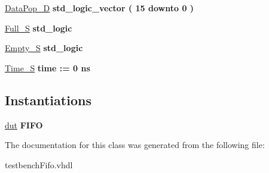\begin{DoxyCompactItemize}
\hyperlink{classtestbenchFifo_1_1behavioural_ae499ada87cc818d9c7db0eb51171e2a3}{Data\+Pop\+\_\+D} {\bfseries \textcolor{vhdlchar}{std\+\_\+logic\+\_\+vector}\textcolor{vhdlchar}{ }\textcolor{vhdlchar}{(}\textcolor{vhdlchar}{ }\textcolor{vhdlchar}{ } \textcolor{vhdldigit}{15} \textcolor{vhdlchar}{ }\textcolor{vhdlchar}{downto}\textcolor{vhdlchar}{ }\textcolor{vhdlchar}{ } \textcolor{vhdldigit}{0} \textcolor{vhdlchar}{ }\textcolor{vhdlchar}{)}\textcolor{vhdlchar}{ }} 
\item 
\mbox{\label{classtestbenchFifo_1_1behavioural_af3c5c52f0175abfe6b7cd4c58d8369d6}} 
\hyperlink{classtestbenchFifo_1_1behavioural_af3c5c52f0175abfe6b7cd4c58d8369d6}{Full\+\_\+S} {\bfseries \textcolor{vhdlchar}{std\+\_\+logic}\textcolor{vhdlchar}{ }} 
\item 
\mbox{\label{classtestbenchFifo_1_1behavioural_a2738eb7280730713739f7d5b4a7c54c0}} 
\hyperlink{classtestbenchFifo_1_1behavioural_a2738eb7280730713739f7d5b4a7c54c0}{Empty\+\_\+S} {\bfseries \textcolor{vhdlchar}{std\+\_\+logic}\textcolor{vhdlchar}{ }} 
\item 
\mbox{\label{classtestbenchFifo_1_1behavioural_a0035bbbbe75eab32d24b9cdfe6072461}} 
\hyperlink{classtestbenchFifo_1_1behavioural_a0035bbbbe75eab32d24b9cdfe6072461}{Time\+\_\+S} {\bfseries \textcolor{vhdlchar}{time}\textcolor{vhdlchar}{ }\textcolor{vhdlchar}{ }\textcolor{vhdlchar}{\+:}\textcolor{vhdlchar}{=}\textcolor{vhdlchar}{ }\textcolor{vhdlchar}{ }\textcolor{vhdlchar}{ } \textcolor{vhdldigit}{0} \textcolor{vhdlchar}{ }\textcolor{vhdlchar}{ns}\textcolor{vhdlchar}{ }} 
\end{DoxyCompactItemize}
\subsection*{Instantiations}
 \begin{DoxyCompactItemize}
\item 
\mbox{\label{classtestbenchFifo_1_1behavioural_a623de4718fe48a8e036a1041bd516956}} 
\hyperlink{classtestbenchFifo_1_1behavioural_a623de4718fe48a8e036a1041bd516956}{dut}  {\bfseries F\+I\+FO}   
\end{DoxyCompactItemize}


The documentation for this class was generated from the following file\+:\begin{DoxyCompactItemize}
\item 
testbench\+Fifo.\+vhdl\end{DoxyCompactItemize}
